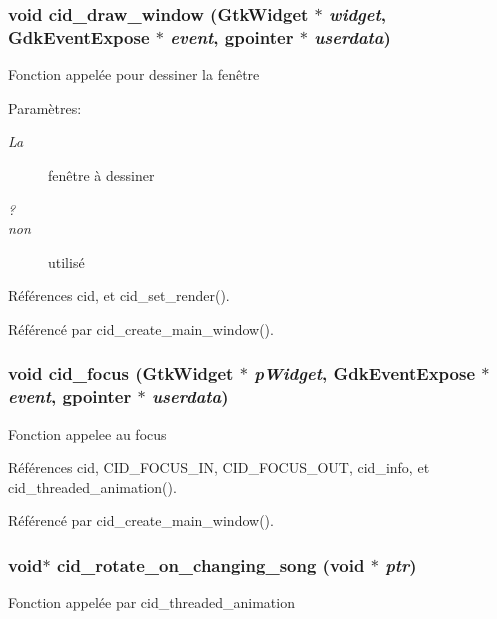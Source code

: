 \subsubsection{\setlength{\rightskip}{0pt plus 5cm}void cid\_\-draw\_\-window (GtkWidget $\ast$ {\em widget}, \/  GdkEventExpose $\ast$ {\em event}, \/  gpointer $\ast$ {\em userdata})}\label{cid-main_8h_feafbc365c714b4d2154591f3b9423d5}


Fonction appelée pour dessiner la fenêtre \begin{Desc}
\item[Paramètres:]
\begin{description}
\item[{\em La}]fenêtre à dessiner \item[{\em ?}]\item[{\em non}]utilisé \end{description}
\end{Desc}


Références cid, et cid\_\-set\_\-render().

Référencé par cid\_\-create\_\-main\_\-window().
\subsubsection{\setlength{\rightskip}{0pt plus 5cm}void cid\_\-focus (GtkWidget $\ast$ {\em pWidget}, \/  GdkEventExpose $\ast$ {\em event}, \/  gpointer $\ast$ {\em userdata})}\label{cid-main_8h_53b806a2d95d2c3f4a4e998b2ab0f4f2}


Fonction appelee au focus 

Références cid, CID\_\-FOCUS\_\-IN, CID\_\-FOCUS\_\-OUT, cid\_\-info, et cid\_\-threaded\_\-animation().

Référencé par cid\_\-create\_\-main\_\-window().
\subsubsection{\setlength{\rightskip}{0pt plus 5cm}void$\ast$ cid\_\-rotate\_\-on\_\-changing\_\-song (void $\ast$ {\em ptr})}\label{cid-main_8h_f16aea4bb7c83bdd621e61e2b2d73845}


Fonction appelée par cid\_\-threaded\_\-animation 

